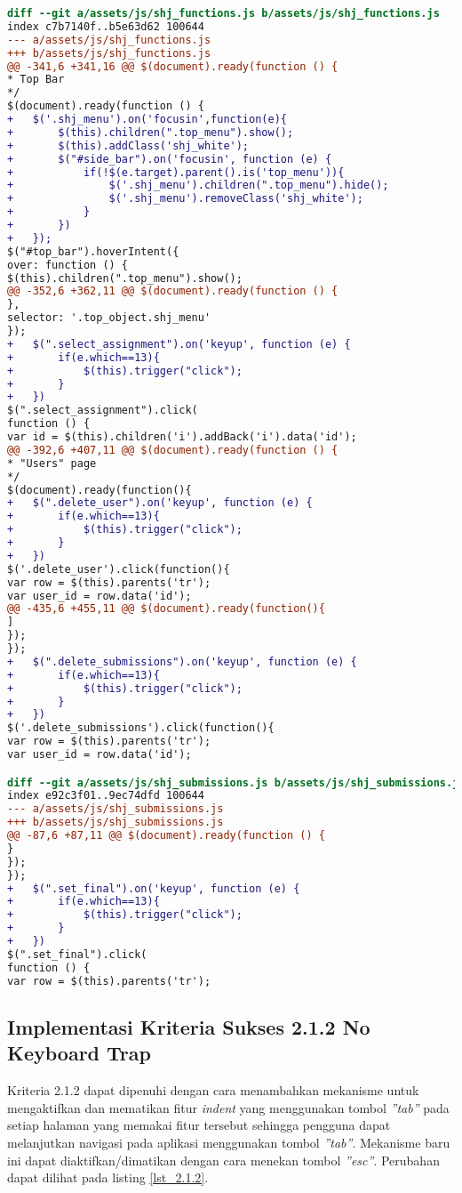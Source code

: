 \begin{itemize}
\begin{lstlisting}[language=diff, caption=Perubahan untuk mematuhi kriteria 2.1.1, label=lst_2.1.1, basicstyle=\ttfamily, frame=single,
columns=fullflexible, keepspaces=true, breaklines=true]
diff --git a/assets/js/shj_functions.js b/assets/js/shj_functions.js
index c7b7140f..b5e63d62 100644
--- a/assets/js/shj_functions.js
+++ b/assets/js/shj_functions.js
@@ -341,6 +341,16 @@ $(document).ready(function () {
* Top Bar
*/
$(document).ready(function () {
+ 	$('.shj_menu').on('focusin',function(e){
+ 		$(this).children(".top_menu").show();
+ 		$(this).addClass('shj_white');
+ 		$("#side_bar").on('focusin', function (e) {
+ 			if(!$(e.target).parent().is('top_menu')){
+ 				$('.shj_menu').children(".top_menu").hide();
+ 				$('.shj_menu').removeClass('shj_white');
+ 			}
+ 		})
+ 	});
$("#top_bar").hoverIntent({
over: function () {
$(this).children(".top_menu").show();
@@ -352,6 +362,11 @@ $(document).ready(function () {
},
selector: '.top_object.shj_menu'
});
+ 	$(".select_assignment").on('keyup', function (e) {
+ 		if(e.which==13){
+ 			$(this).trigger("click");
+ 		}
+ 	})
$(".select_assignment").click(
function () {
var id = $(this).children('i').addBack('i').data('id');
@@ -392,6 +407,11 @@ $(document).ready(function () {
* "Users" page
*/
$(document).ready(function(){
+ 	$(".delete_user").on('keyup', function (e) {
+ 		if(e.which==13){
+ 			$(this).trigger("click");
+ 		}
+ 	})
$('.delete_user').click(function(){
var row = $(this).parents('tr');
var user_id = row.data('id');
@@ -435,6 +455,11 @@ $(document).ready(function(){
]
});
});
+ 	$(".delete_submissions").on('keyup', function (e) {
+ 		if(e.which==13){
+ 			$(this).trigger("click");
+ 		}
+ 	})
$('.delete_submissions').click(function(){
var row = $(this).parents('tr');
var user_id = row.data('id');

diff --git a/assets/js/shj_submissions.js b/assets/js/shj_submissions.js
index e92c3f01..9ec74dfd 100644
--- a/assets/js/shj_submissions.js
+++ b/assets/js/shj_submissions.js
@@ -87,6 +87,11 @@ $(document).ready(function () {
}
});
});
+ 	$(".set_final").on('keyup', function (e) {
+ 		if(e.which==13){
+ 			$(this).trigger("click");
+ 		}
+ 	})
$(".set_final").click(
function () {
var row = $(this).parents('tr');
\end{lstlisting}

\end{itemize}


\subsection{Implementasi Kriteria Sukses 2.1.2 No Keyboard Trap}
\label{subsec:implementasi_A_2.1.2}

Kriteria 2.1.2 dapat dipenuhi dengan cara menambahkan mekanisme untuk mengaktifkan dan mematikan fitur \textit{indent} yang menggunakan tombol \textit{''tab''} pada setiap halaman yang memakai fitur tersebut sehingga pengguna dapat melanjutkan navigasi pada aplikasi menggunakan tombol \textit{''tab''}. Mekanisme baru ini dapat diaktifkan/dimatikan dengan cara menekan tombol \textit{''esc''}. Perubahan dapat dilihat pada listing \ref{lst_2.1.2}.

